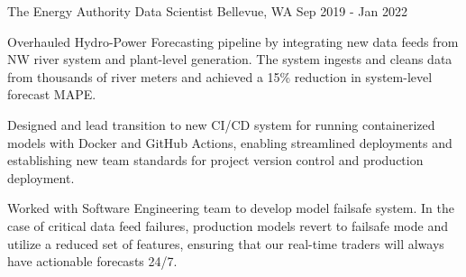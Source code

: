 \begin{cventries}
  \cveducationentry
    {The Energy Authority} %
    {Data Scientist} %
    {Bellevue, WA} %
    {Sep 2019 - Jan 2022} %
    {
      \begin{cvitems} %
        \item {Overhauled Hydro-Power Forecasting pipeline by integrating new data feeds from NW river system and plant-level generation. The system ingests and cleans data from thousands of river meters and achieved a 15\% reduction in system-level forecast MAPE.}
        \item {Designed and lead transition to new CI/CD system for running containerized models with Docker and GitHub Actions, enabling streamlined deployments and establishing new team standards for project version control and production deployment.}
        \item {Worked with Software Engineering team to develop model failsafe system. In the case of critical data feed failures, production models revert to failsafe mode and utilize a reduced set of features, ensuring that our real-time traders will always have actionable forecasts 24/7.}
      \end{cvitems}
    }


\end{cventries}
